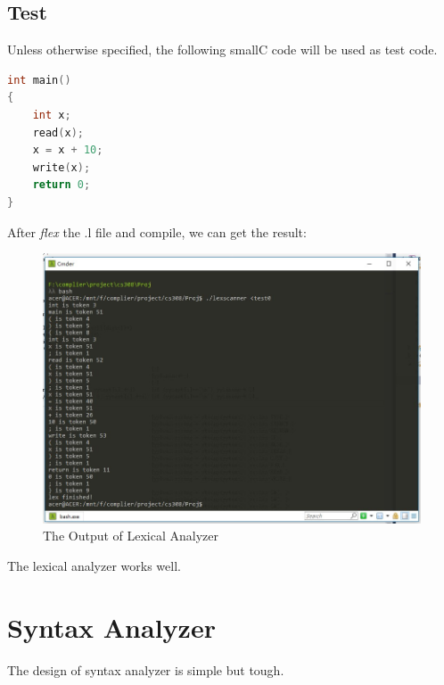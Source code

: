 \documentclass{article}
\begin{document}
\subsection{Test}

Unless otherwise specified, the following smallC code will be used as test code. 

\begin{lstlisting}[language = C,title={test.c}] 
int main()
{
	int x;
	read(x);
	x = x + 10;
	write(x);
	return 0;
}
\end{lstlisting}

After \textit{flex} the .l file and compile, we can get the result:

\begin{figure}[h]
\begin{center}
\includegraphics[width=1\textwidth]{Lex.jpg} %
\caption{The Output of Lexical Analyzer}
\end{center}
\end{figure}

The lexical analyzer works well.


\section{Syntax Analyzer}

The design of syntax analyzer is simple but tough.
\end{document}
